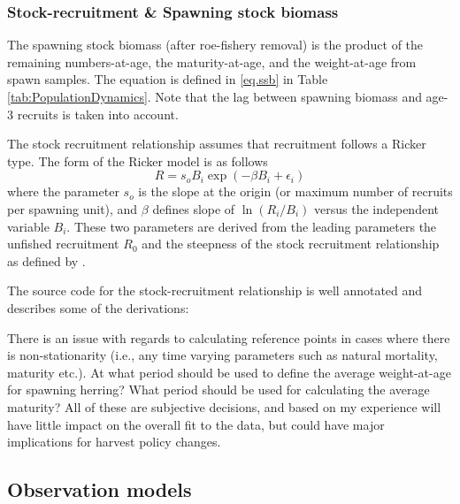 \documentclass[12pt,letterpaper]{article}
\begin{document}
    \subsubsection{Stock-recruitment \& Spawning stock biomass} %
    \label{ssub:stock_recruitment_&_spawning_stock_biomass}
    The spawning stock biomass (after roe-fishery removal) is the product of the remaining numbers-at-age, the maturity-at-age, and the weight-at-age from spawn samples.  The equation is defined in \eqref{eq.ssb} in Table \ref{tab:PopulationDynamics}.  Note that the lag between spawning biomass and age-3 recruits is taken into account.

    The stock recruitment relationship assumes that recruitment follows a Ricker type.  The form  of the Ricker model is as follows \[ R = s_o B_i \exp(-\beta B_i + \epsilon_i)\] where the parameter $s_o$ is the slope at the origin (or maximum number of recruits per spawning unit), and $\beta$ defines slope of $\ln(R_i/B_i)$ versus the independent variable $B_i$.  These two parameters are derived from the leading parameters the unfished recruitment $R_0$ and the steepness of the stock recruitment relationship as defined by \citep{mace1988generalised,}.

    The source code for the stock-recruitment relationship is well annotated and describes some of the derivations:
    \begin{small}
    
      
    \end{small}

    There is an issue with regards to calculating reference points in cases where there is non-stationarity (i.e., any time varying parameters such as natural mortality, maturity etc.).  At what period should be used to define the average weight-at-age for spawning herring? What period should be used for calculating the average maturity?  All of these are subjective decisions, and based on my experience will have little impact on the overall fit to the data, but could have major implications for harvest policy changes. 


  \subsection{Observation models} %
  \label{sub:observation_models}
\end{document}
